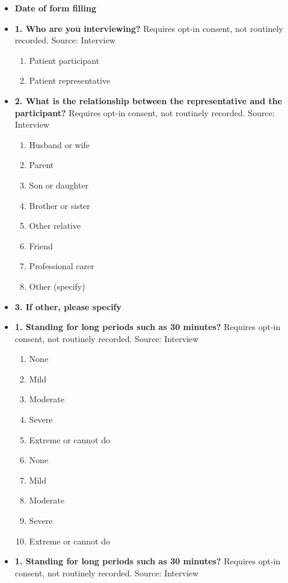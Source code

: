 \documentclass[
]{scrartcl}
\providecommand{\tightlist}{%
  \setlength{\itemsep}{0pt}\setlength{\parskip}{0pt}}\usepackage{longtable,booktabs,array}
\begin{document}
\begin{itemize}
\item
  \textbf{Date of form filling}
\item
  \textbf{1. Who are you interviewing?} Requires opt-in consent, not
  routinely recorded. Source: Interview

  \begin{enumerate}
  \def\labelenumi{\arabic{enumi}.}
  \tightlist
  \item
    Patient participant
  \item
    Patient representative
  \end{enumerate}
\item
  \textbf{2. What is the relationship between the representative and the
  participant?} Requires opt-in consent, not routinely recorded. Source:
  Interview

  \begin{enumerate}
  \def\labelenumi{\arabic{enumi}.}
  \tightlist
  \item
    Husband or wife
  \item
    Parent
  \item
    Son or daughter
  \item
    Brother or sister
  \item
    Other relative
  \item
    Friend
  \item
    Professional carer
  \item
    Other (specify)
  \end{enumerate}
\item
  \textbf{3. If other, please specify}
\item
  \textbf{1. Standing for long periods such as 30 minutes?} Requires
  opt-in consent, not routinely recorded. Source: Interview

  \begin{enumerate}
  \def\labelenumi{\arabic{enumi}.}
  \tightlist
  \item
    None
  \item
    Mild
  \item
    Moderate
  \item
    Severe
  \item
    Extreme or cannot do
  \item
    None
  \item
    Mild
  \item
    Moderate
  \item
    Severe
  \item
    Extreme or cannot do
  \end{enumerate}
\item
  \textbf{1. Standing for long periods such as 30 minutes?} Requires
  opt-in consent, not routinely recorded. Source: Interview


\end{itemize}
\end{document}
